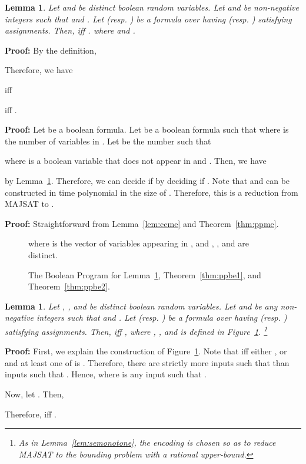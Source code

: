\documentclass{llncs}
\newtheorem{lemma}[theorem]{Lemma}
\newenvironment{proof}{\noindent\rm{\bf Proof:}}{\hbox{}\vspace*{0.2\baselineskip}}
\newenvironment{reftheorem}[1]{\begin{trivlist}\item[\hskip
      \labelsep{\bf Theorem #1.}]\it}{\end{trivlist}}
\begin{document}
\begin{lemma}
\label{lem:gemonotone}
Let  and  be distinct boolean random variables.  Let 
and  be non-negative integers such that  and
.  Let  (resp. ) be a formula
over  having  (resp. ) satisfying assignments. Then,
 iff .  where  and .
\end{lemma}
\begin{proof}
By the definition, 

Therefore, we have 

iff

iff .
\end{proof}

\begin{reftheorem}{\ref{thm:ppge}}

\end{reftheorem}
\begin{proof}
Let  be a boolean formula.  Let  be a boolean formula
such that   where  is the number of variables in .  Let  be the number such that

where  is a boolean variable that does not appear in  and .  
Then, we have

by Lemma~\ref{lem:gemonotone}.  Therefore, we can decide if
 by deciding if .  Note that  and  can be constructed in time
polynomial in the size of .  Therefore, this is a reduction from
\textrm{MAJSAT} to .
\end{proof}


\begin{reftheorem}{\ref{thm:ppcc}}
  
\end{reftheorem}
\begin{proof}
  Straightforward from Lemma~\ref{lem:ccme} and Theorem~\ref{thm:ppme}.
\end{proof}

\begin{figure}[t]

where  is the vector of variables appearing in 
, and , , and  are distinct.
\caption{The Boolean Program for Lemma~\ref{lem:be2mono}, Theorem~\ref{thm:ppbe1}, and Theorem~\ref{thm:ppbe2}.}
\label{fig:boolenc3}
\end{figure}

\begin{lemma}
\label{lem:be2mono}
Let , , and  be distinct boolean random variables.
Let  and  be any non-negative integers such that  and .  Let  (resp.
) be a formula over  having  (resp. )
satisfying assignments. Then,  iff , where
, , and  is defined in
Figure~\ref{fig:boolenc3}.
\footnote{As in Lemma~\ref{lem:semonotone}, the encoding is
    chosen so as to reduce MAJSAT to the bounding problem with a
    rational upper-bound.}
\end{lemma}
\begin{proof}
First, we explain the construction  of
Figure~\ref{fig:boolenc3}.  Note that  iff
either , or 
and at least one of  is .  Therefore,
there are strictly more inputs  such that  than inputs  such that .  Hence,
 where  is any input such that
.

Now, let .  Then,

Therefore,  iff .
\end{proof}
\end{document}
